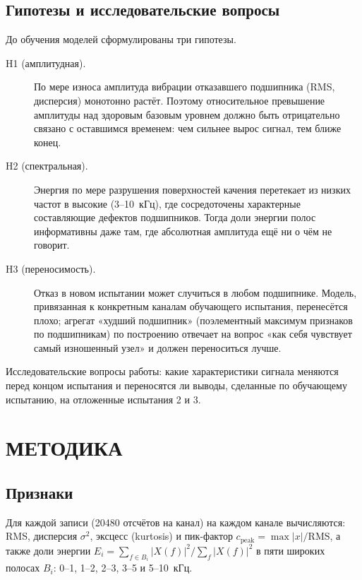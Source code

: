 \documentclass[14pt,a4paper]{extarticle}
\begin{document}
\subsection{Гипотезы и исследовательские вопросы}

До обучения моделей сформулированы три гипотезы.

\begin{description}
  \item[H1 (амплитудная).] По мере износа амплитуда вибрации отказавшего
  подшипника (RMS, дисперсия) монотонно растёт. Поэтому относительное
  превышение амплитуды над здоровым базовым уровнем должно быть отрицательно
  связано с оставшимся временем: чем сильнее вырос сигнал, тем ближе конец.
  \item[H2 (спектральная).] Энергия по мере разрушения поверхностей качения
  перетекает из низких частот в высокие (3--10~кГц), где сосредоточены
  характерные составляющие дефектов подшипников. Тогда доли энергии полос
  информативны даже там, где абсолютная амплитуда ещё ни о чём не говорит.
  \item[H3 (переносимость).] Отказ в новом испытании может случиться в любом
  подшипнике. Модель, привязанная к конкретным каналам обучающего испытания,
  перенесётся плохо; агрегат «худший подшипник» (поэлементный максимум
  признаков по подшипникам) по построению отвечает на вопрос «как себя
  чувствует самый изношенный узел» и должен переноситься лучше.
\end{description}

Исследовательские вопросы работы: какие характеристики сигнала меняются
перед концом испытания и переносятся ли выводы, сделанные по обучающему
испытанию, на отложенные испытания 2 и 3.

\section{МЕТОДИКА}

\subsection{Признаки}

Для каждой записи (20480 отсчётов на канал) на каждом канале вычисляются:
RMS, дисперсия $\sigma^2$, эксцесс (kurtosis) и пик-фактор
$c_{\text{peak}} = \max|x|/\mathrm{RMS}$, а также доли энергии
$E_i = \sum_{f \in B_i} |X(f)|^2 \big/ \sum_f |X(f)|^2$
в пяти широких полосах $B_i$: 0--1, 1--2, 2--3, 3--5 и 5--10~кГц.
\end{document}
